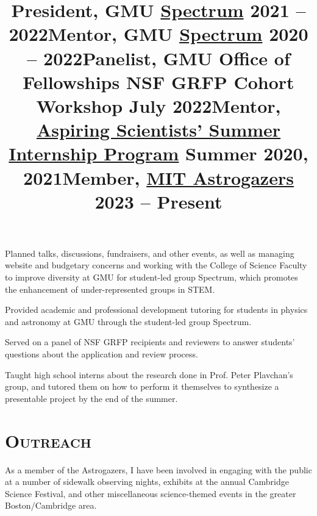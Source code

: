 \documentclass[marg, centered]{res}
\begin{document}
\begin{resume}
\vspace{-0.2cm}
\title{\textbf{President}, GMU \href{https://gmuspectrum.squarespace.com/}{\color{dkbu} Spectrum} \hfill \textbf{2021 -- 2022}}
\begin{position}
{\small Planned talks, discussions, fundraisers, and other events, as well as managing website and budgetary concerns and working with the College of Science Faculty to improve diversity at GMU for student-led group Spectrum, which promotes the enhancement of under-represented groups in STEM.}
\end{position}

\vspace{-0.2cm}
\title{\textbf{Mentor}, GMU \href{https://gmuspectrum.squarespace.com/}{\color{dkbu} Spectrum} \hfill \textbf{2020 -- 2022}}
\begin{position}
{\small Provided academic and professional development tutoring for students in physics and astronomy at GMU through the student-led group Spectrum.}
\end{position}

\vspace{-0.2cm}
\title{\textbf{Panelist}, GMU Office of Fellowships NSF GRFP Cohort Workshop \hfill \textbf{July 2022}}
\begin{position}
{\small Served on a panel of NSF GRFP recipients and reviewers to answer students' questions about the application and review process.}
\end{position}

\vspace{-0.2cm}
\title{\textbf{Mentor}, \href{https://science.gmu.edu/assip}{\color{dkbu} Aspiring Scientists' Summer Internship Program} \hfill \textbf{Summer 2020, 2021}}
\begin{position}
{\small Taught high school interns about the research done in Prof. Peter Plavchan's group, and tutored them on how to perform it themselves to synthesize a presentable project by the end of the summer.}
\end{position}


\section{{\scshape \bfseries Outreach}}

\title{\textbf{Member}, \href{https://astrogazers.mit.edu/}{\color{dkbu} MIT Astrogazers} \hfill \textbf{2023 -- Present}}
\begin{position}
{\small As a member of the Astrogazers, I have been involved in engaging with the public at a number of sidewalk observing nights, exhibits at the annual Cambridge Science Festival, and other miscellaneous science-themed events in the greater Boston/Cambridge area.}
\end{position}


\end{resume}
\end{document}
